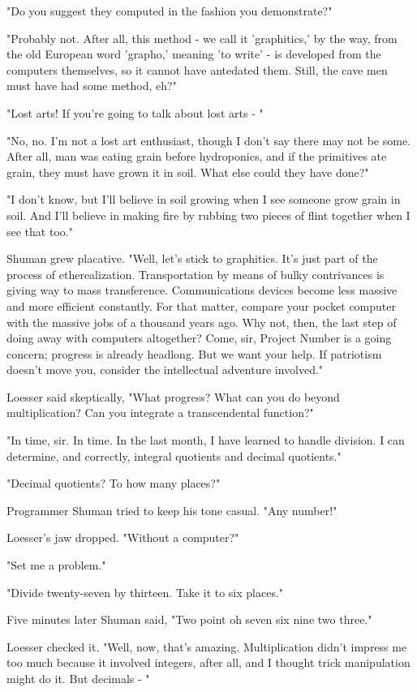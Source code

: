 \documentclass{amsart}
\begin{document}
"Do you suggest they computed in the fashion you demonstrate?"

"Probably not. After all, this method - we call it 'graphitics,' by
the way, from the old European word 'grapho,' meaning 'to write' - is
developed from the computers themselves, so it cannot have antedated
them. Still, the cave men must have had some method, eh?"

"Lost arts! If you're going to talk about lost arts - "

"No, no. I'm not a lost art enthusiast, though I don't say there may
not be some. After all, man was eating grain before hydroponics, and
if the primitives ate grain, they must have grown it in soil. What
else could they have done?"

"I don't know, but I'll believe in soil growing when I see someone
grow grain in soil. And I'll believe in making fire by rubbing two
pieces of flint together when I see that too."

Shuman grew placative. "Well, let's stick to graphitics. It's just
part of the process of etherealization. Transportation by means of
bulky contrivances is giving way to mass transference. Communications
devices become less massive and more efficient constantly. For that
matter, compare your pocket computer with the massive jobs of a
thousand years ago. Why not, then, the last step of doing away with
computers altogether? Come, sir, Project Number is a going concern;
progress is already headlong. But we want your help. If patriotism
doesn't move you, consider the intellectual adventure involved."

Loesser said skeptically, "What progress? What can you do beyond
multiplication? Can you integrate a transcendental function?"

"In time, sir. In time. In the last month, I have learned to handle
division. I can determine, and correctly, integral quotients and
decimal quotients."

"Decimal quotients? To how many places?"

Programmer Shuman tried to keep his tone casual. "Any number!"

Loesser's jaw dropped. "Without a computer?"

"Set me a problem."

"Divide twenty-seven by thirteen. Take it to six places."

Five minutes later Shuman said, "Two point oh seven six nine two
three."

Loesser checked it. "Well, now, that's amazing. Multiplication didn't
impress me too much because it involved integers, after all, and I
thought trick manipulation might do it. But decimals - "
\end{document}
